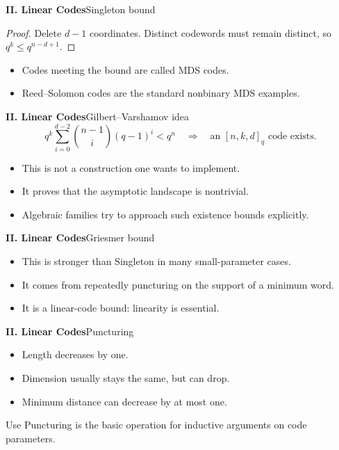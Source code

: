 \begin{frame}{\textbf{II. Linear Codes}}{Singleton bound}
\small
{}
\begin{proof}
Delete $d-1$ coordinates. Distinct codewords must remain distinct, so $q^k\le q^{n-d+1}$.
\end{proof}
\begin{itemize}
  \item Codes meeting the bound are called MDS codes.
  \item Reed--Solomon codes are the standard nonbinary MDS examples.
\end{itemize}
\end{frame}

\begin{frame}{\textbf{II. Linear Codes}}{Gilbert--Varshamov idea}
\small
{}
\[
  q^k\sum_{i=0}^{d-2}\binom{n-1}{i}(q-1)^i < q^n
  \quad\Rightarrow\quad
  \text{an }[n,k,d]_q\text{ code exists.}
\]
\begin{itemize}
  \item This is not a construction one wants to implement.
  \item It proves that the asymptotic landscape is nontrivial.
  \item Algebraic families try to approach such existence bounds explicitly.
\end{itemize}
\end{frame}

\begin{frame}{\textbf{II. Linear Codes}}{Griesmer bound}
\small
{}
\begin{itemize}
  \item This is stronger than Singleton in many small-parameter cases.
  \item It comes from repeatedly puncturing on the support of a minimum word.
  \item It is a linear-code bound: linearity is essential.
\end{itemize}
\end{frame}

\begin{frame}{\textbf{II. Linear Codes}}{Puncturing}
\small
{}
\begin{itemize}
  \item Length decreases by one.
  \item Dimension usually stays the same, but can drop.
  \item Minimum distance can decrease by at most one.
\end{itemize}
\begin{block}{Use}
Puncturing is the basic operation for inductive arguments on code parameters.
\end{block}
\end{frame}

